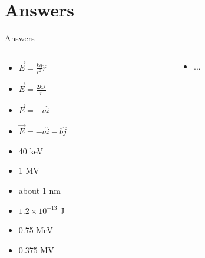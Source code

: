 \documentclass{beamer}
\begin{document}
\section{Answers}

\begin{frame}{Answers}
\small
\begin{columns}[T]
\begin{column}{0.5\textwidth}
\begin{itemize}
\item $\vec{E} = \frac{kq}{r^2}\hat{r}$
\item $\vec{E} = \frac{2k\lambda}{r}$
\item $\vec{E} = -a\hat{i}$
\item $\vec{E} = -a\hat{i}-b\hat{j}$
\item 40 keV
\item 1 MV
\item about 1 nm
\item $1.2 \times 10^{-13}$ J
\item 0.75 MeV
\item 0.375 MV
\end{itemize}
\end{column}
\begin{column}{0.5\textwidth}
\begin{itemize}
\item ...
\end{itemize}
\end{column}
\end{columns}
\end{frame}
\end{document}
